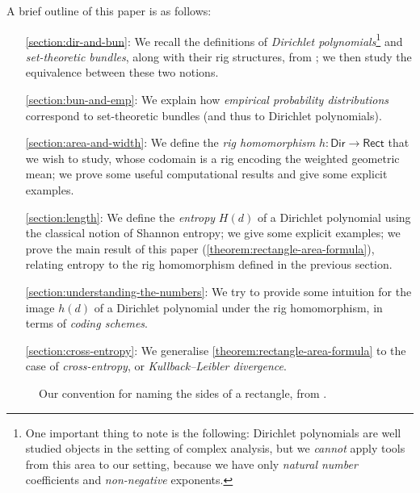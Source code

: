 \documentclass[11pt,fleqn]{article}
\newcommand{\rig}[1]{\mathsf{#1}}
\newcommand{\Dir}{\rig{Dir}}
\newcommand{\Rect}{\rig{Rect}}
\begin{document}
A brief outline of this paper is as follows:
\begin{itemize}
  \item[\cref{section:dir-and-bun}:]
    We recall the definitions of \emph{Dirichlet polynomials}\footnote{One important thing to note is the following: Dirichlet polynomials are well studied objects in the setting of complex analysis, but we \emph{cannot} apply tools from this area to our setting, because we have only \emph{natural number} coefficients and \emph{non-negative} exponents.} and \emph{set-theoretic bundles}, along with their rig structures, from \cite{SM2020};
    we then study the equivalence between these two notions.
  \item[\cref{section:bun-and-emp}:]
    We explain how \emph{empirical probability distributions} correspond to set-theoretic bundles (and thus to Dirichlet polynomials).
  \item[\cref{section:area-and-width}:]
    We define the \emph{rig homomorphism} $h\colon\Dir\to\Rect$ that we wish to study, whose codomain is a rig encoding the weighted geometric mean;
    we prove some useful computational results and give some explicit examples.
  \item[\cref{section:length}:]
    We define the \emph{entropy} $H(d)$ of a Dirichlet polynomial using the classical notion of Shannon entropy;
    we give some explicit examples;
    we prove the main result of this paper (\cref{theorem:rectangle-area-formula}), relating entropy to the rig homomorphism defined in the previous section.
  \item[\cref{section:understanding-the-numbers}:]
    We try to provide some intuition for the image $h(d)$ of a Dirichlet polynomial under the rig homomorphism, in terms of \emph{coding schemes}.
  \item[\cref{section:cross-entropy}:]
    We generalise \cref{theorem:rectangle-area-formula} to the case of \emph{cross-entropy}, or \emph{Kullback--Leibler divergence}.
\end{itemize}

\begin{figure}[h!]
\centering
  \caption{Our convention for naming the sides of a rectangle, from \cite{KS2020}.}
\end{figure}
\end{document}

